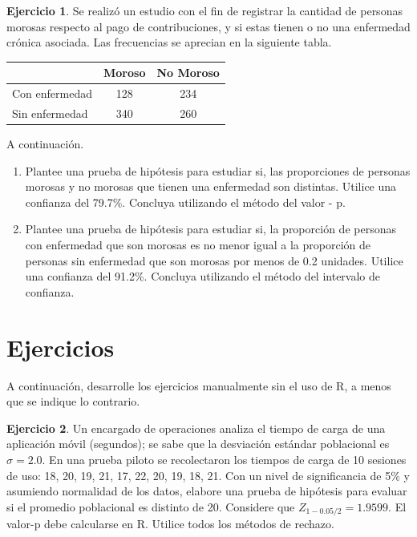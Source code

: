 \documentclass[
  11pt,
]{book}
\theoremstyle{definition}
\theoremstyle{definition}
\theoremstyle{definition}
\newtheorem{exercise}{Ejercicio}[chapter]
\theoremstyle{definition}
\theoremstyle{remark}
\begin{document}
\begin{exercise}

Se realizó un estudio con el fin de registrar la cantidad de personas morosas respecto al pago de contribuciones, y si estas tienen o no una enfermedad crónica asociada. Las frecuencias se aprecian en la siguiente tabla.

\begin{table}[H]
\centering
\begin{tabular}[t]{lcc}
\toprule
  & Moroso & No Moroso\\
\midrule
Con enfermedad & 128 & 234\\
Sin enfermedad & 340 & 260\\
\bottomrule
\end{tabular}
\end{table}

A continuación.

\begin{enumerate}
\def\labelenumi{\arabic{enumi}.}
\item
  Plantee una prueba de hipótesis para estudiar si, las proporciones de personas morosas y no morosas que tienen una enfermedad son distintas. Utilice una confianza del 79.7\%. Concluya utilizando el método del valor - p.
\item
  Plantee una prueba de hipótesis para estudiar si, la proporción de personas con enfermedad que son morosas es no menor igual a la proporción de personas sin enfermedad que son morosas por menos de 0.2 unidades. Utilice una confianza del 91.2\%. Concluya utilizando el método del intervalo de confianza.
\end{enumerate}

\end{exercise}

\section{Ejercicios}\label{ejercicios-unidad2}

A continuación, desarrolle los ejercicios manualmente sin el uso de R, a menos que se indique lo contrario.

\begin{exercise}
Un encargado de operaciones analiza el tiempo de carga de una aplicación móvil (segundos); se sabe que la desviación estándar poblacional es \(\sigma=2.0\). En una prueba piloto se recolectaron los tiempos de carga de 10 sesiones de uso: 18, 20, 19, 21, 17, 22, 20, 19, 18, 21. Con un nivel de significancia de 5\% y asumiendo normalidad de los datos, elabore una prueba de hipótesis para evaluar si el promedio poblacional es distinto de 20. Considere que \(Z_{1-0.05/2}=1.9599\). El valor-p debe calcularse en R. Utilice todos los métodos de rechazo.
\end{exercise}
\end{document}
